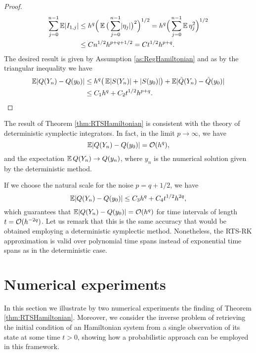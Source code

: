 \documentclass[10pt]{article}
\begin{document}
\begin{proof}
\begin{equation}
\begin{aligned}
	\sum_{j=0}^{n-1} \operatorname{\mathbb{E}} \lvert I_{1,j}\rvert &\leq h^q \Big(\operatorname{\mathbb{E}} \big(\sum_{j=0}^{n-1}\lvert\eta_j\rvert \big)^2\Big)^{1/2} = h^q\Big(\sum_{j=0}^{n-1}\operatorname{\mathbb{E}} \eta_j^2\Big)^{1/2} \\
	&\leq C n^{1/2}h^{p+q+1/2} = C t^{1/2}h^{p+q}.
\end{aligned}	
\end{equation}
The desired result is given by Assumption \ref{as:RegHamiltonian} and as by the triangular inequality we have
\begin{equation}
\begin{aligned}
	\operatorname{\mathbb{E}}\lvert Q(Y_n) - Q(y_0)\rvert &\leq h^q \big(\operatorname{\mathbb{E}}\lvert S(Y_n)\rvert + \lvert S(y_0)\rvert\big) + \operatorname{\mathbb{E}} \lvert\tilde Q(Y_n) - \tilde Q(y_0)\rvert\\
	&\leq C_1h^q + C_2 t^{1/2}h^{p+q}.
\end{aligned}
\end{equation}
\end{proof}

\begin{remark} The result of Theorem \ref{thm:RTSHamiltonian} is consistent with the theory of deterministic symplectic integrators. In fact, in the limit $p \to \infty$, we have
	\begin{equation}
		\operatorname{\mathbb{E}} \lvert Q(Y_n) - Q(y_0)\rvert = \mathcal{O}(h^q),
	\end{equation}
	and the expectation $\operatorname{\mathbb{E}} Q(Y_n) \to Q(y_n)$, where $y_n$ is the numerical solution given by the deterministic method.
\end{remark}
\begin{remark} If we choose the natural scale for the noise $p = q + 1/2$, we have
\begin{equation}\label{eq:OptimalNoiseScale}
	\operatorname{\mathbb{E}}\lvert Q(Y_n) - Q(y_0)\rvert \leq C_3 h^q + C_4t^{1/2}h^{2q},
\end{equation} 
which guarantees that $\operatorname{\mathbb{E}}\lvert Q(Y_n) - Q(y_0)\rvert = \mathcal{O}(h^q)$ for time intervals of length $t = \mathcal{O}(h^{-2q})$. Let us remark that this is the same accuracy that would be obtained employing a deterministic symplectic method. Nonetheless, the RTS-RK approximation is valid over polynomial time spans instead of exponential time spans as in the deterministic case.
\end{remark}

\section{Numerical experiments}\label{sec:NUMEXP}
In this section we illustrate by two numerical experiments the finding of Theorem \ref{thm:RTSHamiltonian}. Moreover, we consider the inverse problem of retrieving the initial condition of an Hamiltonian system from a single observation of its state at some time $t > 0$, showing how a probabilistic approach can be employed in this framework.
\end{document}
